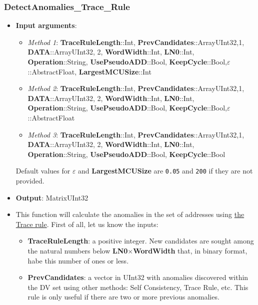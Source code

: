  \subsubsection*{DetectAnomalies\_Trace\_Rule}\label{Fun:DetectAnomaliesTraceRule}
 \begin{itemize}
	 \item \textbf{Input arguments}: 
	 \begin{itemize}
	 	\item \textit{Method 1}: \textbf{TraceRuleLength}::Int, \textbf{PrevCandidates}::Array{UInt32,1}, \textbf{DATA}::Array{UInt32, 2}, \textbf{WordWidth}::Int, \textbf{LN0}::Int,  \textbf{Operation}::String, \textbf{UsePseudoADD}::Bool, \textbf{KeepCycle}::Bool,\textbf{\(\varepsilon\)}::AbstractFloat, \textbf{LargestMCUSize}::Int
	 	\item \textit{Method 2}: \textbf{TraceRuleLength}::Int, 
	 	\textbf{PrevCandidates}::Array{UInt32,1}, \textbf{DATA}::Array{UInt32, 2}, \textbf{WordWidth}::Int, \textbf{LN0}::Int,  \textbf{Operation}::String, \textbf{UsePseudoADD}::Bool, \textbf{KeepCycle}::Bool,\textbf{\(\varepsilon\)}::AbstractFloat
	 	\item \textit{Method 3}: \textbf{TraceRuleLength}::Int,
	 	\textbf{PrevCandidates}::Array{UInt32,1}, \textbf{DATA}::Array{UInt32, 2}, \textbf{WordWidth}::Int, \textbf{LN0}::Int,  \textbf{Operation}::String, \textbf{UsePseudoADD}::Bool, \textbf{KeepCycle}::Bool
	 \end{itemize}
	 Default values for \textbf{\(\varepsilon\)} and \textbf{LargestMCUSize} are \texttt{0.05} and \texttt{200} if they are not provided.
	 \item \textbf{Output}: Matrix{UInt32}
	 \item This function will calculate the anomalies in the set of addresses using \hyperref[Subsec:TraceRule]{the Trace rule}. 
	 First of all, let us know the inputs:
	 \begin{itemize}
	 	\item \textbf{TraceRuleLength}: a positive integer. New candidates are sought among the natural numbers below \textbf{LN0}\(\times\)\textbf{WordWidth} that, in binary format, habe this number of ones or less.
	 	
	 	\item \textbf{PrevCandidates}: a vector in UInt32 with anomalies discovered within the DV set using other methods: Self Consistency, Trace Rule, etc. This rule is only useful if there are two or more previous anomalies. 
	 	

\end{itemize}
\end{itemize}
